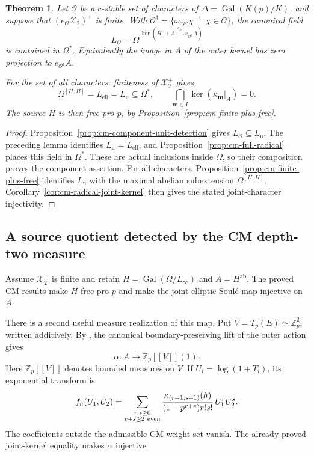 \documentclass[11pt]{article}
\newtheorem{theorem}{Theorem}[section]
\theoremstyle{definition}\newtheorem{definition}[theorem]{Definition}
\begin{document}
\begin{theorem}\label{thm:cm-finite-plus-abelian}
Let \(\mathcal O\) be a \(c\)-stable set of characters of
\(\Delta=\operatorname{Gal}(K(p)/K)\), and suppose that
\((e_{\mathcal O}\mathcal X_2)^+\) is finite.
With
\(\mathcal O^\dagger=\{\omega_{\mathrm{cyc}}\chi^{-1}:
                                         \chi\in\mathcal O\}\),
the canonical field
\[
 L_{\mathcal O}=
 \Omega^{\,\ker(H\longrightarrow A
                \xrightarrow{\,e_{\mathcal O^\dagger}\,}
                              e_{\mathcal O^\dagger}A)}
\]
is contained in \(\Omega^*\).
Equivalently the image in \(A\) of the outer kernel has
zero projection to \(e_{\mathcal O^\dagger}A\).

For the set of all characters, finiteness of
\(\mathcal X_2^+\) gives
\[
 \Omega^{[H,H]}=L_{\mathrm{ell}}=L_{\mathrm u}
                   \subseteq\Omega^*,\qquad
 \bigcap_{\boldsymbol m\in I}\ker(\kappa_{\boldsymbol m}|_A)=0.
\]
The source \(H\) is then free pro-\(p\), by
Proposition~\ref{prop:cm-finite-plus-free}.
\end{theorem}

\begin{proof}
Proposition~\ref{prop:cm-component-unit-detection} gives
\(L_{\mathcal O}\subseteq L_{\mathrm u}\).
The preceding lemma identifies
\(L_{\mathrm u}=L_{\mathrm{ell}}\), and
Proposition~\ref{prop:cm-full-radical} places this field in
\(\Omega^*\).
These are actual inclusions inside \(\Omega\), so their
composition proves the component assertion.
For all characters, Proposition~\ref{prop:cm-finite-plus-free}
identifies \(L_{\mathrm u}\) with the maximal abelian
subextension \(\Omega^{[H,H]}\).
Corollary~\ref{cor:cm-radical-joint-kernel} then gives the
stated joint-character injectivity.
\end{proof}

\subsection{A source quotient detected by the CM depth-two measure}
\label{subsec:cm-measure-class-two}

Assume \(\mathcal X_2^+\) is finite and retain
\(H=\operatorname{Gal}(\Omega/L_\infty)\) and
\(A=H^{\mathrm{ab}}\).  The proved CM results make \(H\)
free pro-\(p\) and make the joint elliptic Soul\'e map
injective on \(A\).

There is a second useful measure realization of this map.
Put \(V=T_p(E)\simeq\mathbb Z_p^2\), written additively.
By \cite[Lemma 2.4, Definition 2.5 and Theorem 2.6,
pp.~7--8]{Ishii}, the canonical boundary-preserving
lift of the outer action gives
\[
 \alpha:A\longrightarrow
       \mathbb Z_p[[V]](1).
\]
Here \(\mathbb Z_p[[V]]\) denotes bounded measures on \(V\).
If \(U_i=\log(1+T_i)\), its exponential transform is
\[
 f_h(U_1,U_2)
 =\sum_{\substack{r,s\geq0\\r+s\geq2\ {\rm even}}}
 \frac{\kappa_{(r+1,s+1)}(h)}
      {(1-p^{r+s})r!s!}\,U_1^rU_2^s .
\]
The coefficients outside the admissible CM weight set
vanish.  The already proved joint-kernel equality makes
\(\alpha\) injective.
\end{document}

